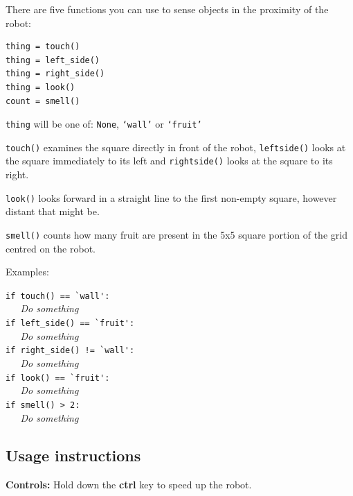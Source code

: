 \documentclass[12pt,a4paper,twoside]{article}
\renewcommand{\_}{\texttt{\symbol{95}}}
\begin{document}
There are five functions you can use to sense objects in the proximity
of the robot:

\begin{verbatim}
thing = touch()
thing = left_side()
thing = right_side()
thing = look()
count = smell()
\end{verbatim}

\begin{bulletlist}
\item \texttt{thing} will be one of:
	\texttt{None}, \texttt{`wall'} or \texttt{`fruit'}

\item \texttt{touch()} examines the square directly in front of the
	robot, \texttt{left\_side()} looks at the square immediately to its
	left and \texttt{right\_side()} looks at the square to its right.

\item \texttt{look()} looks forward in a straight line to the first
	non-empty square, however distant that might be.

\item \texttt{smell()} counts how many fruit are present
	in the 5x5 square portion of the grid centred on the robot.
\end{bulletlist}

Examples:

\verb^if touch() == `wall':^\\
\verb^   ^\textit{Do something}\\

\verb^if left_side() == `fruit':^\\
\verb^   ^\textit{Do something}\\

\verb^if right_side() != `wall':^\\
\verb^   ^\textit{Do something}\\

\verb^if look() == `fruit':^\\
\verb^   ^\textit{Do something}\\

\verb^if smell() > 2:^\\
\verb^   ^\textit{Do something}\\

\subsection{Usage instructions}

\textbf{Controls:}
Hold down the \textbf{ctrl} key to speed up the robot.
\end{document}
